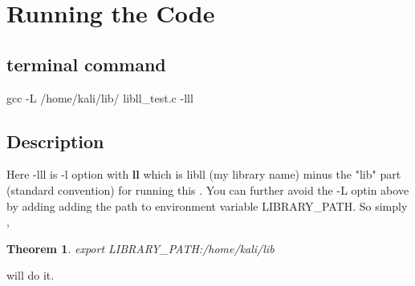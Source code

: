 \documentclass{article}
\newtheorem{theorem}{Theorem}[section] %
\begin{document}
\section{Running the Code}
\subsection{terminal command}
gcc -L /home/kali/lib/ libll\_test.c -lll
\subsection{Description}
Here -lll is -l option with \textbf{ll} which is libll (my library name) minus the "lib" part (standard convention) for running this .
You can further avoid the -L optin above by adding adding the path to environment variable LIBRARY\_PATH.
So simply ,

\begin{theorem}{export LIBRARY\_PATH:/home/kali/lib}
\end{theorem}
will do it.
\end{document}
